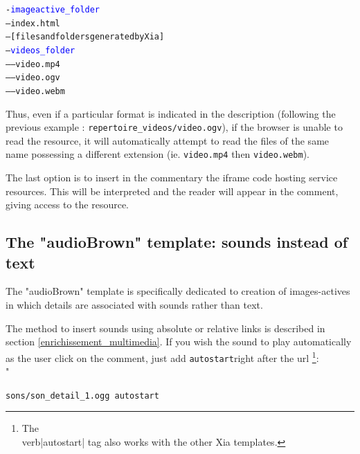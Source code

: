 \begin{tikzpicture}
\end{tikzpicture}
\parbox{0.40\textwidth}
{
\begin{alltt}
 -\textcolor{blue}{imageactive\_folder}\\
 ---index.html\\
 ---[files and folders generated by Xia]\\
 ---\textcolor{blue}{videos\_folder}\\
 -----video.mp4\\
 -----video.ogv\\
 -----video.webm\\
\end{alltt}
}


Thus, even if a particular format is indicated in the description (following 
the previous example : \verb|repertoire_videos/video.ogv|), if the browser is 
unable to read the resource, it will automatically attempt to read the files 
of the same name possessing a different extension (ie. \verb|video.mp4| 
then \verb|video.webm|).

The last option is to insert in the commentary the iframe code hosting service 
resources. This will be interpreted and the reader will appear in the comment, 
giving access to the resource.

\subsection{The "audioBrown" template: sounds instead of text}

The "audioBrown" template is specifically dedicated to creation of 
images-actives in which details are associated with sounds rather than text.

The method to insert sounds using absolute or relative links is described in 
section 
\ref{enrichissement_multimedia}. If you wish the sound to play 
automatically as the user click on the comment, just add \verb|autostart|right 
after the url \footnote{The \\verb|autostart| tag also works with the other 
Xia templates.}:\\"
\begin{center}
 \verb|sons/son_detail_1.ogg autostart|
\end{center}


